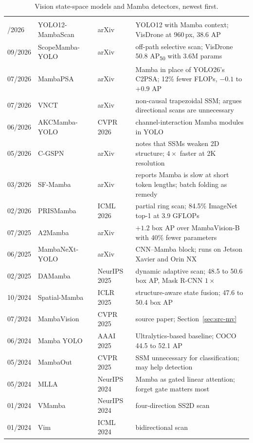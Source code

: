 \begin{table}[htbp]
\centering
\caption[Vision state-space models and Mamba detectors, newest first]{Vision
state-space models and Mamba detectors, newest first.}
\label{tab:sota-ssm}
\small
\begin{tabularx}{\textwidth}{@{}P{1.35cm}P{3.0cm}P{2.1cm}L@{}}
 &  &  &  \\ /2026 & YOLO12-MambaScan~\citep{yolo12mambascan2026} & arXiv & YOLO12 with Mamba context; VisDrone at 960\,px, 38.6 AP \\
09/2026 & ScopeMamba-YOLO~\citep{scopemamba2026} & arXiv & off-path selective scan; VisDrone 50.8 AP\textsubscript{50} with 3.6M params \\
07/2026 & MambaPSA~\citep{mambapsa2026} & arXiv & Mamba in place of YOLO26's C2PSA; 12\% fewer FLOPs, $-0.1$ to $+0.9$ AP \\
07/2026 & VNCT~\citep{vnct2026} & arXiv & non-causal trapezoidal SSM; argues directional scans are unnecessary \\
06/2026 & AKCMamba-YOLO~\citep{akcmamba2026} & CVPR 2026 & channel-interaction Mamba modules in YOLO \\
05/2026 & C-GSPN~\citep{cgspn2026} & arXiv & notes that SSMs weaken 2D structure; $4\times$ faster at 2K resolution \\
03/2026 & SF-Mamba~\citep{sfmamba2026} & arXiv & reports Mamba is slow at short token lengths; batch folding as remedy \\
02/2026 & PRISMamba~\citep{prismamba2026} & ICML 2026 & partial ring scan; 84.5\% ImageNet top-1 at 3.9 GFLOPs \\
07/2025 & A2Mamba~\citep{a2mamba2025} & arXiv & $+1.2$ box AP over MambaVision-B with 40\% fewer parameters \\
06/2025 & MambaNeXt-YOLO~\citep{mambanextyolo2025} & arXiv & CNN--Mamba block; runs on Jetson Xavier and Orin NX \\
02/2025 & DAMamba~\citep{damamba2025} & NeurIPS 2025 & dynamic adaptive scan; 48.5 to 50.6 box AP, Mask R-CNN $1\times$ \\
10/2024 & Spatial-Mamba~\citep{xiao2025spatialmamba} & ICLR 2025 & structure-aware state fusion; 47.6 to 50.4 box AP \\
07/2024 & MambaVision~\citep{hatamizadeh2025mambavision} & CVPR 2025 & source paper; Section~\ref{sec:src-mv} \\
06/2024 & Mamba YOLO~\citep{wang2025mambayolo} & AAAI 2025 & Ultralytics-based baseline; COCO 44.5 to 52.1 AP \\
05/2024 & MambaOut~\citep{yu2025mambaout} & CVPR 2025 & SSM unnecessary for classification; may help detection \\
05/2024 & MLLA~\citep{han2024mlla} & NeurIPS 2024 & Mamba as gated linear attention; forget gate matters most \\
01/2024 & VMamba~\citep{liu2024vmamba} & NeurIPS 2024 & four-direction SS2D scan \\
01/2024 & Vim~\citep{zhu2024vim} & ICML 2024 & bidirectional scan \\
\end{tabularx}
\end{table}

